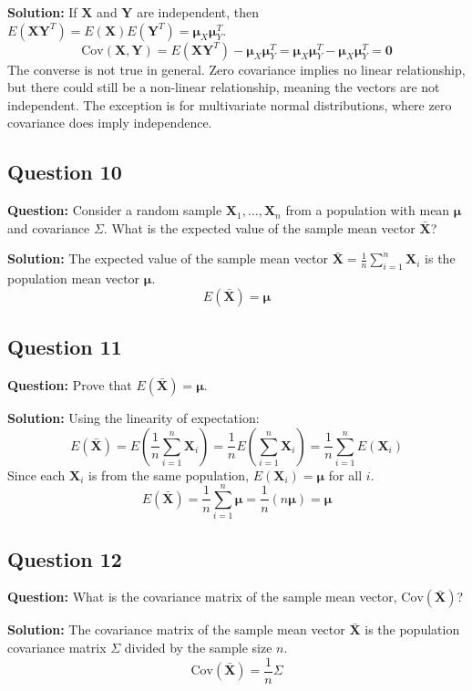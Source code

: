 \textbf{Solution:}
If $\mathbf{X}$ and $\mathbf{Y}$ are independent, then $E(\mathbf{X}\mathbf{Y}^T) = E(\mathbf{X})E(\mathbf{Y}^T) = \boldsymbol{\mu}_X \boldsymbol{\mu}_Y^T$.
$$ \text{Cov}(\mathbf{X}, \mathbf{Y}) = E(\mathbf{X}\mathbf{Y}^T) - \boldsymbol{\mu}_X \boldsymbol{\mu}_Y^T = \boldsymbol{\mu}_X \boldsymbol{\mu}_Y^T - \boldsymbol{\mu}_X \boldsymbol{\mu}_Y^T = \mathbf{0} $$
The converse is not true in general. Zero covariance implies no linear relationship, but there could still be a non-linear relationship, meaning the vectors are not independent. The exception is for multivariate normal distributions, where zero covariance does imply independence.

\subsection*{Question 10}
\textbf{Question:} Consider a random sample $\mathbf{X}_1, \dots, \mathbf{X}_n$ from a population with mean $\boldsymbol{\mu}$ and covariance $\Sigma$. What is the expected value of the sample mean vector $\bar{\mathbf{X}}$?

\textbf{Solution:}
The expected value of the sample mean vector $\bar{\mathbf{X}} = \frac{1}{n}\sum_{i=1}^n \mathbf{X}_i$ is the population mean vector $\boldsymbol{\mu}$.
$$ E(\bar{\mathbf{X}}) = \boldsymbol{\mu} $$

\subsection*{Question 11}
\textbf{Question:} Prove that $E(\bar{\mathbf{X}}) = \boldsymbol{\mu}$.

\textbf{Solution:}
Using the linearity of expectation:
$$ E(\bar{\mathbf{X}}) = E\left(\frac{1}{n}\sum_{i=1}^n \mathbf{X}_i\right) = \frac{1}{n} E\left(\sum_{i=1}^n \mathbf{X}_i\right) = \frac{1}{n} \sum_{i=1}^n E(\mathbf{X}_i) $$
Since each $\mathbf{X}_i$ is from the same population, $E(\mathbf{X}_i) = \boldsymbol{\mu}$ for all $i$.
$$ E(\bar{\mathbf{X}}) = \frac{1}{n} \sum_{i=1}^n \boldsymbol{\mu} = \frac{1}{n} (n\boldsymbol{\mu}) = \boldsymbol{\mu} $$

\subsection*{Question 12}
\textbf{Question:} What is the covariance matrix of the sample mean vector, $\text{Cov}(\bar{\mathbf{X}})$?

\textbf{Solution:}
The covariance matrix of the sample mean vector $\bar{\mathbf{X}}$ is the population covariance matrix $\Sigma$ divided by the sample size $n$.
$$ \text{Cov}(\bar{\mathbf{X}}) = \frac{1}{n}\Sigma $$

